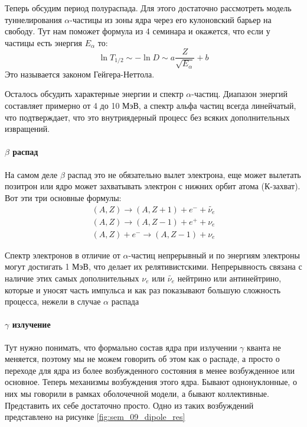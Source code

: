\documentclass[12pt]{article}
\begin{document}
Теперь обсудим период полураспада. Для этого достаточно рассмотреть модель туннелирования $\alpha$-частицы из зоны ядра через его кулоновский барьер на свободу. Тут нам поможет формула из 4 семинара и окажется, что если у частицы есть энергия $E_{\alpha}$ то:
\begin{equation}
    \ln{T_{1/2}} \sim -\ln{D} \sim a \dfrac{Z}{\sqrt{E_{\alpha}}} + b
\end{equation}
Это называется законом Гейгера-Неттола. 

Осталось обсудить характерные энергии и спектр $\alpha$-частиц. Диапазон энергий составляет примерно от 4 до 10 МэВ, а спектр альфа частиц всегда линейчатый, что подтверждает, что это внутриядерный процесс без всяких дополнительных извращений.

\paragraph{$\beta$ распад}
На самом деле $\beta$ распад это не обязательно вылет электрона, еще может вылетать позитрон или ядро может захватывать электрон с нижних орбит атома (К-захват). Вот эти три основные формулы:
\begin{gather*}
    (A,Z) \rightarrow (A, Z+1) + e^- + \widetilde{\nu_e}\\
    (A,Z) \rightarrow (A, Z-1) + e^+ + \nu_e\\
    (A,Z) +e^- \rightarrow (A, Z-1) + \nu_e
\end{gather*}

Спектр электронов в отличие от $\alpha$-частиц непрерывный и по энергиям электроны могут достигать 1 МэВ, что делает их релятивистскими. Непрерывность связана с наличие этих самых дополнительных $\nu_e$ или $\widetilde{\nu_e}$ нейтрино или антинейтрино, которые и уносят часть импульса и как раз показывают большую сложность процесса, нежели в случае $\alpha$ распада

\paragraph{$\gamma$ излучение}
Тут нужно понимать, что формально состав ядра при излучении $\gamma$ кванта не меняется, поэтому мы не можем говорить об этом как о распаде, а просто о переходе для ядра из более возбужденного состояния в менее возбужденное или основное. Теперь механизмы возбуждения этого ядра. Бывают однонуклонные, о них мы говорили в рамках оболочечной модели, а бывают коллективные. Представить их себе достаточно просто. Одно из таких возбуждений представлено на рисунке \ref{fig:sem_09_dipole_res}
\end{document}
